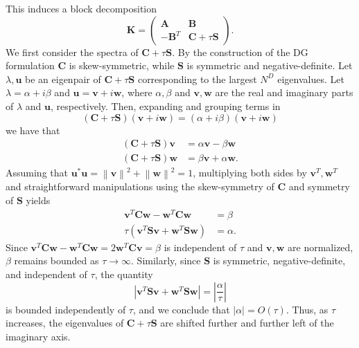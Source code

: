 \documentclass[10pt]{article}
\newcommand{\nor}[1]{\left\| #1 \right\|}
\newcommand{\LRp}[1]{\left( #1 \right)}
\newcommand{\LRb}[1]{\left| #1 \right|}
\begin{document}
This induces a block decomposition
\[
\bm{K} = \left(\begin{array}{cc}
\bm{A} & \bm{B}\\
-\bm{B}^T & \bm{C} + \tau \bm{S}
\end{array}\right).
\]
We first consider the spectra of $\bm{C} + \tau\bm{S}$.  By the construction of the DG formulation $\bm{C}$ is skew-symmetric, while $\bm{S}$ is symmetric and negative-definite.  Let $\lambda, \bm{u}$ be an eigenpair of $\bm{C} + \tau{\bm{S}}$ corresponding to the largest $N^D$ eigenvalues. Let $\lambda = \alpha + i\beta$ and $\bm{u} = \bm{v} + i\bm{w}$, where $\alpha,\beta$ and $\bm{v},\bm{w}$ are the real and imaginary parts of $\lambda$ and $\bm{u}$, respectively.  Then, expanding and grouping terms in
\[
(\bm{C}+\tau\bm{S})(\bm{v} + i\bm{w}) = (\alpha + i\beta) (\bm{v} + i\bm{w})
\]
we have that
\begin{align*}
(\bm{C}+\tau\bm{S})\bm{v} &= \alpha\bm{v}-\beta\bm{w}\\
(\bm{C}+\tau\bm{S})\bm{w} &= \beta\bm{v}+\alpha\bm{w}.
\end{align*}
Assuming that $\bm{u}^*\bm{u} = \nor{\bm{v}}^2 + \nor{\bm{w}}^2 = 1$, multiplying both sides by $\bm{v}^T,\bm{w}^T$ and straightforward manipulations %
using the skew-symmetry of $\bm{C}$ and symmetry of $\bm{S}$ yields
\begin{align*}
\bm{v}^T\bm{C}\bm{w} - \bm{w}^T\bm{C}\bm{w} &= \beta\\
\tau\LRp{\bm{v}^T\bm{S}\bm{v} + \bm{w}^T\bm{S}\bm{w}} &= \alpha.
\end{align*}
Since $\bm{v}^T\bm{C}\bm{w} - \bm{w}^T\bm{C}\bm{w}= 2\bm{w}^T\bm{C}\bm{v} = \beta$ is independent of $\tau$ and $\bm{v},\bm{w}$ are normalized, $\beta$ remains bounded as $\tau\rightarrow \infty$.  Similarly, since $\bm{S}$ is symmetric, negative-definite, and independent of $\tau$, the quantity
\[
\LRb{\bm{v}^T\bm{S}\bm{v} + \bm{w}^T\bm{S}\bm{w}} = \LRb{\frac{\alpha}{\tau}}
\]
is bounded independently of $\tau$, and we conclude that $\LRb{\alpha} = O(\tau)$.  Thus, as $\tau$ increases, the eigenvalues of $\bm{C} + \tau\bm{S}$ are shifted further and further left of the imaginary axis.  
\end{document}
